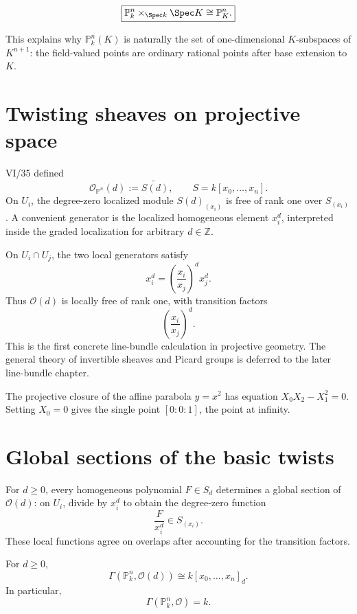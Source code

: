 \begin{theorem}\label{thm:vi36-base-change}
\[
\boxed{\mathbb P^n_k\times_{\Spec k}\Spec K\cong\mathbb P^n_K.}
\]
\end{theorem}

This explains why \(\mathbb P^n_k(K)\) is naturally the set of one-dimensional \(K\)-subspaces of \(K^{n+1}\): the field-valued points are ordinary rational points after base extension to \(K\).

\section{Twisting sheaves on projective space}
VI/35 defined
\[
\mathcal O_{\mathbb P^n}(d):=\widetilde{S(d)},
\qquad S=k[x_0,\ldots,x_n].
\]
On \(U_i\), the degree-zero localized module \(S(d)_{(x_i)}\) is free of rank one over \(S_{(x_i)}\).  A convenient generator is the localized homogeneous element \(x_i^d\), interpreted inside the graded localization for arbitrary \(d\in\mathbb Z\).

On \(U_i\cap U_j\), the two local generators satisfy
\[
x_i^d=\left(\frac{x_i}{x_j}\right)^d x_j^d.
\]
Thus \(\mathcal O(d)\) is locally free of rank one, with transition factors
\[
\left(\frac{x_i}{x_j}\right)^d.
\]
This is the first concrete line-bundle calculation in projective geometry.  The general theory of invertible sheaves and Picard groups is deferred to the later line-bundle chapter.



\begin{example}\label{ex:vi36-expand-03}
The projective closure of the affine parabola $y=x^2$ has equation $X_0X_2-X_1^2=0$.  Setting $X_0=0$ gives the single point $[0:0:1]$, the point at infinity.
\end{example}
\section{Global sections of the basic twists}
For \(d\ge0\), every homogeneous polynomial \(F\in S_d\) determines a global section of \(\mathcal O(d)\): on \(U_i\), divide by \(x_i^d\) to obtain the degree-zero function
\[
\frac{F}{x_i^d}\in S_{(x_i)}.
\]
These local functions agree on overlaps after accounting for the transition factors.

\begin{theorem}\label{thm:vi36-global-sections}
For \(d\ge0\),
\[
\boxed{\Gamma(\mathbb P^n_k,\mathcal O(d))\cong k[x_0,\ldots,x_n]_d.}
\]
In particular,
\[
\Gamma(\mathbb P^n_k,\mathcal O)=k.
\]
\end{theorem}

